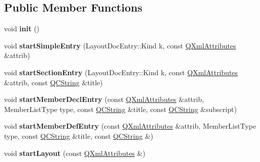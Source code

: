 \subsection*{Public Member Functions}
\begin{DoxyCompactItemize}
\item 
\mbox{\label{class_layout_parser_a243d5eae295c4957a37c5521a0d677f5}} 
void {\bfseries init} ()
\item 
\mbox{\label{class_layout_parser_af06bd886b0d723dbc6f9ec2d95c6c8d1}} 
void {\bfseries start\+Simple\+Entry} (Layout\+Doc\+Entry\+::\+Kind k, const \mbox{\hyperlink{class_q_xml_attributes}{Q\+Xml\+Attributes}} \&attrib)
\item 
\mbox{\label{class_layout_parser_abc6401e54a9617520571194d40d6c2ec}} 
void {\bfseries start\+Section\+Entry} (Layout\+Doc\+Entry\+::\+Kind k, const \mbox{\hyperlink{class_q_xml_attributes}{Q\+Xml\+Attributes}} \&attrib, const \mbox{\hyperlink{class_q_c_string}{Q\+C\+String}} \&title)
\item 
\mbox{\label{class_layout_parser_ac47233901d4ceddb7b53b94335144441}} 
void {\bfseries start\+Member\+Decl\+Entry} (const \mbox{\hyperlink{class_q_xml_attributes}{Q\+Xml\+Attributes}} \&attrib, Member\+List\+Type type, const \mbox{\hyperlink{class_q_c_string}{Q\+C\+String}} \&title, const \mbox{\hyperlink{class_q_c_string}{Q\+C\+String}} \&subscript)
\item 
\mbox{\label{class_layout_parser_a8c394955e0d4748de57bd04d459a8983}} 
void {\bfseries start\+Member\+Def\+Entry} (const \mbox{\hyperlink{class_q_xml_attributes}{Q\+Xml\+Attributes}} \&attrib, Member\+List\+Type type, const \mbox{\hyperlink{class_q_c_string}{Q\+C\+String}} \&title, const \mbox{\hyperlink{class_q_c_string}{Q\+C\+String}} \&)
\item 
\mbox{\label{class_layout_parser_a1fe962fb0452d1513133f9be74855316}} 
void {\bfseries start\+Layout} (const \mbox{\hyperlink{class_q_xml_attributes}{Q\+Xml\+Attributes}} \&)
\item 
\mbox{\label{class_layout_parser_ae0812943705504094029aef52414675c}} 

\end{DoxyCompactItemize}
